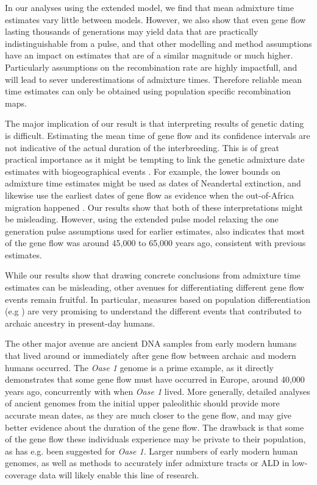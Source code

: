 \documentclass[]{article}
\begin{document}
In our analyses using the extended model, we find that mean admixture time estimates vary little between models. However, we also show that even gene flow lasting thousands of generations may yield data that are practically indistinguishable from a pulse, and that other modelling and method assumptions have an impact on estimates that are of a similar magnitude or much higher. Particularly assumptions on the recombination rate are highly impactfull, and will lead to sever underestimations of admixture times. Therefore reliable mean time estimates can only be obtained using population specific recombination maps.

The major implication of our result is that interpreting results of genetic dating is difficult.  Estimating the mean time of gene flow and its confidence intervals are not indicative of the actual duration of the interbreeding.  This is of great practical importance as it might be tempting to link the genetic admixture date estimates with biogeographical events \citep{sankararaman_date_2012,lazaridis_genomic_2016,jacobs_multiple_2019,vyas_analyses_2019,douka_age_2019}. For example, the lower bounds on admixture time estimates might be used as dates of Neandertal extinction, and likewise use the earliest dates of gene flow as evidence when the out-of-Africa migration happened \citep{sankararaman_date_2012}. Our results show that both of these interpretations might be misleading. However, using the extended pulse model relaxing the one generation pulse assumptions used for earlier estimates, also indicates that most of the gene flow was around 45,000 to 65,000 years ago, consistent with previous estimates.


While our results show that drawing concrete conclusions from admixture time estimates can be misleading, other avenues for differentiating different gene flow events remain fruitful.
In particular, measures based on population differentiation (e.g \citep{browning_analysis_2018,wall_higher_2013,villanea_multiple_2019}) are very promising to understand the different events that contributed to archaic ancestry in present-day humans. 

The other major avenue are ancient DNA samples from early modern humans that lived around or immediately after gene flow between archaic and modern humans occurred. The \textit{Oase 1} \citep{fu_genome_2014} genome is a prime example, as it directly demonstrates that some gene flow must have occurred in Europe, around 40,000 years ago, concurrently with when \textit{Oase 1} lived. More generally, detailed analyses of ancient genomes from the initial upper paleolithic should provide more accurate mean dates, as they are much closer to the gene flow, and may give better evidence about the duration of the gene flow. The drawback is that some of the gene flow these individuals experience may be private to their population, as has e.g. been suggested for \textit{Oase 1}. Larger numbers of early modern human genomes, as well as methods to accurately infer admixture tracts or ALD in low-coverage data will likely enable this line of research. 
\end{document}
